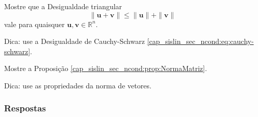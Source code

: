 \begin{exer}\label{cap_sislin_sec_ncond:exer:destria}
  Mostre que a Desigualdade triangular
  \begin{equation}
    \|\pmb{u} + \pmb{v}\| \leq \|\pmb{u}\| + \|\pmb{v}\|
  \end{equation}
  vale para quaisquer $\pmb{u},\pmb{v}\in\mathbb{R}^n$.
\end{exer}
\begin{resp}
  Dica: use a Desigualdade de Cauchy-Schwarz \eqref{cap_sislin_sec_ncond:eq:cauchy-schwarz}.
\end{resp}

\begin{exer}\label{cap_sislin_sec_ncond:exer:propNormaMatriz}
  Mostre a Proposição \ref{cap_sislin_sec_ncond:prop:NormaMatriz}.
\end{exer}
\begin{resp}
  Dica: use as propriedades da norma de vetores.
\end{resp}

\ifisbook
\subsubsection{Respostas}
\shipoutAnswer
\fi





